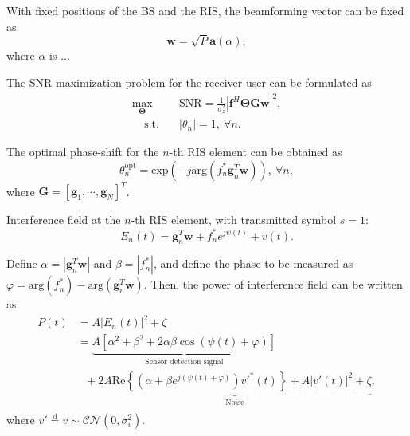 \documentclass[12pt,draftclsnofoot,journal,onecolumn]{IEEEtran}
\theoremstyle{nonumberplain}
\def \opt {^{\text{opt}}}
\def \opt {^{\text{opt}}}
\def \exp {\text{exp}}
\def \arg {\text{arg}}
\begin{document}
With fixed positions of the BS and the RIS, the beamforming vector can be fixed as
\begin{equation}
\label{fixed w}
\bm w=\sqrt{P}\bm a\left(\alpha\right),
\end{equation}
where $\alpha$ is ...

The SNR maximization problem for the receiver user can be formulated as
\begin{subequations}
\label{optimization}
\begin{align}
\label{objective}
\max_{\bm \Theta}~~&\text{SNR}=\frac{1}{\sigma_{z}^{2}}
\left\vert
\bm f^{H}\bm \Theta\bm G\bm w \right\vert^{2},\\
\label{constraint}
~~~~~\text{s.t.~~~}&\left\vert\theta_{n}\right\vert=1,~\forall n.
\end{align}
\end{subequations}

The optimal phase-shift for the $n$-th RIS element can be obtained as
\begin{equation}
\label{optimal RIS}
\theta_{n}\opt = \exp\left(-j\arg\left(f_{n}^{*}\bm g_{n}^{T}\bm w\right)\right),~\forall n,
\end{equation}
where $\bm G = \left[\bm g_{1}, \cdots, \bm g_{N}\right]^{T}$.

Interference field at the $n$-th RIS element, with transmitted symbol $s=1$:
\begin{equation}
\label{interference}
E_{n}(t)=\bm g_{n}^{T}\bm w+f_{n}^{*}e^{j\psi (t)}+v(t).
\end{equation}

Define $\alpha = \left\vert\bm g_{n}^{T}\bm w\right\vert$ and $\beta = \left\vert f_{n}^{*}\right \vert$, and define the phase to be measured as $\varphi = \arg\left(f_{n}^{*}\right)-\arg\left(\bm g_{n}^{T}\bm w\right)$.
Then, the power of interference field can be written as
\begin{equation}
\label{Power of Interference}
\begin{aligned}
P(t)&=A \left| E_{n} (t)\right |^{2}+\zeta\\
&=\underbrace{A\left[\alpha^{2}+\beta^{2}+2\alpha\beta\cos\left(\psi(t)+\varphi\right)\right]}_{\text{Sensor detection signal}}\\
&~~~+\underbrace{2A\text{Re}\left\{\left(\alpha+\beta e^{j\left(\psi(t)+\varphi\right)}\right)v'^{*}(t)\right\}+A\left|v'(t)\right|^{2}+\zeta}_{\text{Noise}},\\
\end{aligned}
\end{equation}
where $v'\overset{\text{d}}{=}v\sim\mathcal{CN}\left(0,\sigma_{v}^{2}\right)$.
\end{document}
